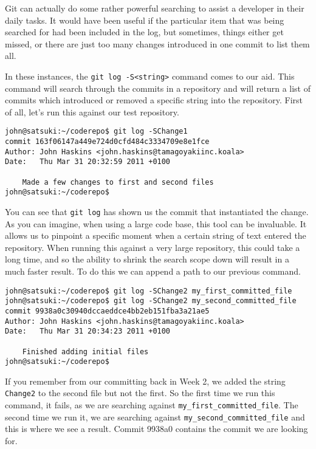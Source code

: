 Git can actually do some rather powerful searching to assist a developer in their daily tasks.  It would have been useful if the particular item that was being searched for had been included in the log, but sometimes, things either get missed, or there are just too many changes introduced in one commit to list them all.

In these instances, the \texttt{git log -S<string>} command comes to our aid.  This command will search through the commits in a repository and will return a list of commits which introduced or removed a specific string into the repository.  First of all, let's run this against our test repository.

\begin{Verbatim}
john@satsuki:~/coderepo$ git log -SChange1
commit 163f06147a449e724d0cfd484c3334709e8e1fce
Author: John Haskins <john.haskins@tamagoyakiinc.koala>
Date:   Thu Mar 31 20:32:59 2011 +0100

    Made a few changes to first and second files
john@satsuki:~/coderepo$ 
\end{Verbatim}

You can see that \texttt{git log} has shown us the commit that instantiated the change.  As you can imagine, when using a large code base, this tool can be invaluable.  It allows us to pinpoint a specific moment when a certain string of text entered the repository.  When running this against a very large repository, this could take a long time, and so the ability to shrink the search scope down will result in a much faster result.  To do this we can append a path to our previous command.  

\begin{Verbatim}
john@satsuki:~/coderepo$ git log -SChange2 my_first_committed_file
john@satsuki:~/coderepo$ git log -SChange2 my_second_committed_file
commit 9938a0c30940dccaeddce4bb2eb151fba3a21ae5
Author: John Haskins <john.haskins@tamagoyakiinc.koala>
Date:   Thu Mar 31 20:34:23 2011 +0100

    Finished adding initial files
john@satsuki:~/coderepo$ 
\end{Verbatim}

If you remember from our committing back in Week 2, we added the string \texttt{Change2} to the second file but not the first.  So the first time we run this command, it fails, as we are searching against \texttt{my\_first\_committed\_file}.  The second time we run it, we are searching against \texttt{my\_second\_committed\_file} and this is where we see a result.  Commit 9938a0 contains the commit we are looking for.

